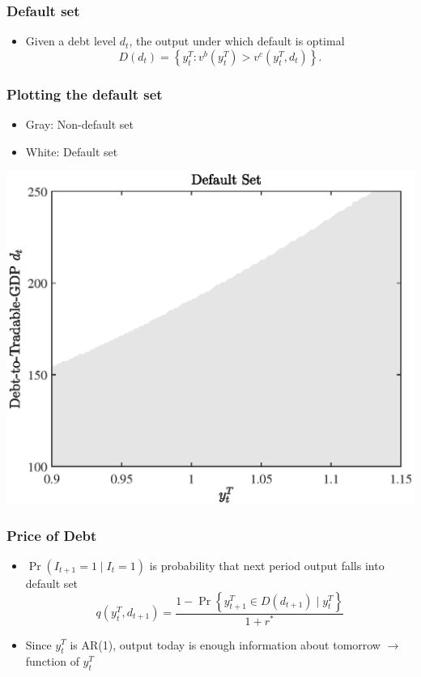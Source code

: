 \documentclass[mathserif]{beamer}
\begin{document}
    \begin{frame}
        \frametitle{Default set}
        \begin{itemize}
            \item Given a debt level $d_t$, the output under which default is optimal
            \begin{equation}
                \label{eq:default-set}
                D(d_t) = \left\{
                    y^T_t : v^b(y^T_t) > v^c(y^T_t, d_t)
                    \right\}.
                \end{equation}
            \end{itemize}
    \end{frame}
    \begin{frame}
        \frametitle{Plotting the default set}
        \begin{itemize}
            \item Gray: Non-default set
            \item White: Default set
        \end{itemize}
        \centering
        \includegraphics[height = 0.7\textheight]{fig/default_set_sri_trad_hp.eps}

    \end{frame}

    \begin{frame}
        \frametitle{Price of Debt}
        \begin{itemize}
            \item $\Pr(I_{t+1}=1 \mid I_{t}=1)$ is probability that next period output falls into default set
            \begin{equation}
                q(y^T_t, d_{t+1}) =
                \frac{1 - \Pr\left\{ y^T_{t+1} \in D(d_{t+1}) \mid y^T_t \right\}}{1 + r^*}
            \end{equation}
            \item Since $y^T_t$ is AR(1), output today is enough information about tomorrow $\rightarrow$ function of $y^T_t$
        \end{itemize}
    \end{frame}
\end{document}
